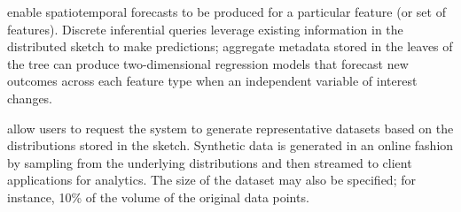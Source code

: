 \begin{description}[leftmargin=*]

\item[Inferential Queries] enable spatiotemporal forecasts to be produced for a particular feature (or set of features). Discrete inferential queries leverage existing information in the distributed sketch to make predictions; aggregate metadata stored in the leaves of the tree can produce two-dimensional regression models that forecast new outcomes across each feature type when an independent variable of interest changes.


\item[Synthetic Data Queries] allow users to request the system to generate representative datasets based on the distributions stored in the sketch. Synthetic data is generated in an online fashion by sampling from the underlying distributions and then streamed to client applications for analytics. The size of the dataset may also be specified; for instance, 10\% of the volume of the original data points.
\end{description}
%
